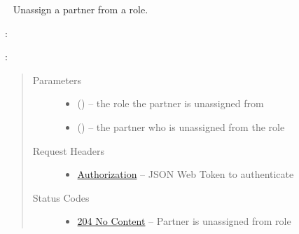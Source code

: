 \documentclass[letterpaper,10pt,english]{sphinxmanual}
\begin{document}
\begin{fulllineitems}
\label{\detokenize{resources/role:delete--roles-(role_id)-members-(partner_id)}}~
Unassign a partner from a role.

:

\begin{sphinxVerbatim}[commandchars=\\\{\}]
  
 
 
\end{sphinxVerbatim}

:

\begin{sphinxVerbatim}[commandchars=\\\{\}]
  
\end{sphinxVerbatim}
\begin{quote}\begin{description}
\item[{Parameters}] \leavevmode\begin{itemize}
\item {} 
 () -- the role the partner is unassigned from

\item {} 
 () -- the partner who is unassigned from the role

\end{itemize}

\item[{Request Headers}] \leavevmode\begin{itemize}
\item {} 
\href{http://tools.ietf.org/html/rfc7235\#section-4.2}{Authorization} -- JSON Web Token to authenticate

\end{itemize}

\item[{Status Codes}] \leavevmode\begin{itemize}
\item {} 
\href{http://www.w3.org/Protocols/rfc2616/rfc2616-sec10.html\#sec10.2.5}{204 No Content} -- Partner is unassigned from role


\end{itemize}
\end{description}
\end{quote}
\end{fulllineitems}
\end{document}
